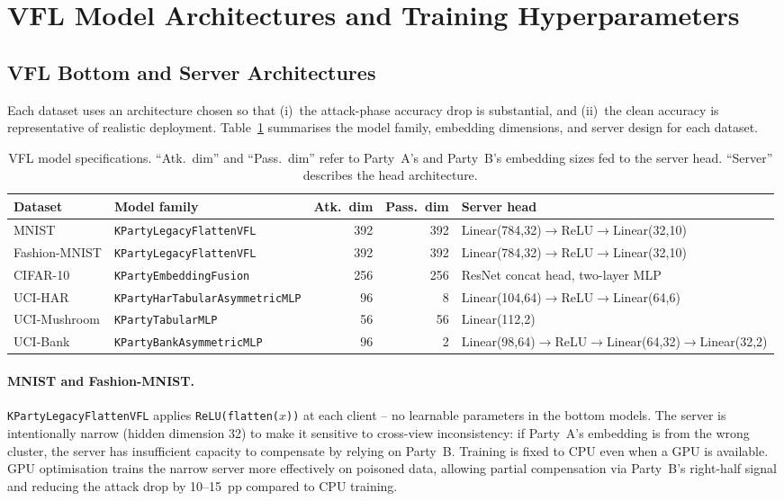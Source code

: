 \documentclass{article}
\begin{document}
\section{VFL Model Architectures and Training Hyperparameters}
\label{app:models}

\subsection{VFL Bottom and Server Architectures}

Each dataset uses an architecture chosen so that (i)~the attack-phase accuracy
drop is substantial, and (ii)~the clean accuracy is representative of
realistic deployment.
Table~\ref{tab:model_arch} summarises the model family, embedding dimensions,
and server design for each dataset.

\begin{table}[h]
\centering
\caption{VFL model specifications. ``Atk.~dim'' and ``Pass.~dim'' refer to
  Party~A's and Party~B's embedding sizes fed to the server head.
  ``Server'' describes the head architecture.}
\label{tab:model_arch}
\small
\setlength{\tabcolsep}{3pt}
\begin{tabular}{l l r r l}
\toprule
\textbf{Dataset} & \textbf{Model family} & \textbf{Atk.\ dim} & \textbf{Pass.\ dim}
  & \textbf{Server head} \\
\midrule
MNIST          & \texttt{KPartyLegacyFlattenVFL}       & 392 & 392
  & Linear(784,32)$\to$ReLU$\to$Linear(32,10) \\
Fashion-MNIST  & \texttt{KPartyLegacyFlattenVFL}       & 392 & 392
  & Linear(784,32)$\to$ReLU$\to$Linear(32,10) \\
CIFAR-10       & \texttt{KPartyEmbeddingFusion}         & 256 & 256
  & ResNet concat head, two-layer MLP \\
UCI-HAR        & \texttt{KPartyHarTabularAsymmetricMLP} &  96 &   8
  & Linear(104,64)$\to$ReLU$\to$Linear(64,6) \\
UCI-Mushroom   & \texttt{KPartyTabularMLP}              &  56 &  56
  & Linear(112,2) \\
UCI-Bank       & \texttt{KPartyBankAsymmetricMLP}       &  96 &   2
  & Linear(98,64)$\to$ReLU$\to$Linear(64,32)$\to$Linear(32,2) \\
\bottomrule
\end{tabular}
\end{table}

\paragraph{MNIST and Fashion-MNIST.}
\texttt{KPartyLegacyFlattenVFL} applies \texttt{ReLU(flatten($x$))} at
each client -- no learnable parameters in the bottom models.
The server is intentionally narrow (hidden dimension 32) to make it sensitive
to cross-view inconsistency: if Party~A's embedding is from the wrong cluster,
the server has insufficient capacity to compensate by relying on Party~B.
Training is fixed to CPU even when a GPU is available.
GPU optimisation trains the narrow server more effectively on poisoned data,
allowing partial compensation via Party~B's right-half signal and reducing
the attack drop by 10--15~pp compared to CPU training.
\end{document}
